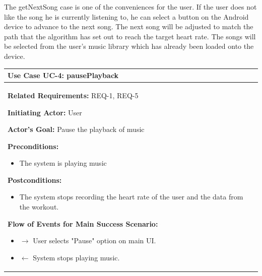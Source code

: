 \documentclass[letterpaper,english, 12pt]{scrreprt}
\begin{document}
The getNextSong case is one of the conveniences for the user. If the user does not like the song he is currently listening to, he can select a button on the Android device to advance to the next song. The next song will be adjusted to match the path that the algorithm has set out to reach the target heart rate. The songs will be selected from the user's music library which has already been loaded onto the device.

\begin{center}
        \begin{tabular}{|C{15cm}|}
                \hline
                        \textbf{Use Case UC-4: pausePlayback}\\
                \hline
                        \begin{flushleft}
                                \textbf{Related Requirements: } REQ-1, REQ-5
                        \end{flushleft}
                        \begin{flushleft}
                                \textbf{Initiating Actor: } User
                        \end{flushleft}
                        \begin{flushleft}
                                \textbf{Actor's Goal: } Pause the playback of music
                        \end{flushleft}
                        \begin{flushleft}
                                \textbf{Preconditions: }
                        \end{flushleft}
                                \begin{itemize}
                                        \item The system is playing music
                                \end{itemize}
                        \begin{flushleft}
                                \textbf{Postconditions: }
                        \end{flushleft}
                                \begin{itemize}
                                        \item The system stops recording the heart rate of the user and the data from the workout.
                                \end{itemize}
                        \begin{flushleft}
                                \textbf{Flow of Events for Main Success Scenario: }
                        \end{flushleft}
                                \begin{itemize}
                                        \item $\rightarrow$ User selects "Pause" option on main UI.
                                        \item $\leftarrow$ System stops playing music.
                                \end{itemize}
                \hline
        \end{tabular}
\end{center}
\end{document}
